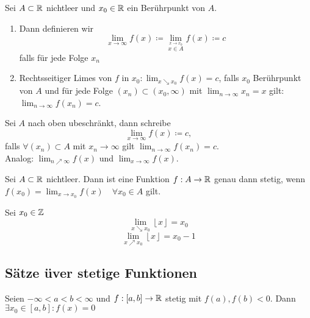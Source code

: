 \begin{subdefinition}
	Sei $ A\subset \mathbb{R} $ nichtleer und $ x_0 \in \mathbb{R}  $ ein Berührpunkt von $ A $.
	\begin{enumerate}[label=\arabic*.]
		\item Dann definieren wir
			\[
				\lim_{x \to \infty} f(x) \coloneqq \lim_{\overset{x\to x_0}{x \in A}} f(x) \coloneqq c
			\]
			falls für jede Folge $ x_n $
		\item Rechtsseitiger Limes von $ f $ in $ x_0: \lim_{x \searrow x_0} f(x) = c $, falls $ x_0 $ Berührpunkt von $ A  $ und für jede Folge $ (x_n) \subset (x_0, \infty) $ mit $ \lim_{n \to \infty} x_n = x $ gilt: $ \lim_{n \to \infty}  f(x_n) = c$.
	\end{enumerate}
	Sei $ A $ nach oben ubeschränkt, dann schreibe
	\[
		\lim_{x \to \infty} f(x) \coloneqq c,
	\]
	falls $ \forall (x_n) \subset A $ mit $ x_n \to \infty $ gilt $ \lim_{n \to \infty} f(x_n) = c $.\\
	Analog: $ \lim_{n \nearrow \infty} f(x) $ und $ \lim_{x \to \infty} f(x) $.
\end{subdefinition}

\begin{subcorollary}
	Sei $ A \subset \mathbb{R}  $ nichtleer. Dann ist eine Funktion $ f: A \to \mathbb{R}  $ genau dann stetig, wenn $ f(x_0) = \lim_{x \to x_0} f(x) \quad \forall x_0 \in A $ gilt.
\end{subcorollary}

\begin{subexample}
	Sei $ x_0 \in \mathbb{Z}  $ 
	\[
		\lim_{x \searrow x_0} \left\lfloor x \right\rfloor = x_0
	\]
	\[
		\lim_{x \nearrow x_0} \left\lfloor x \right\rfloor = x_0 -1
	\]
\end{subexample}

\subsection{Sätze üver stetige Funktionen}
\begin{subtheorem}
	Seien $ -\infty < a < b < \infty $ und $ f:[a, b] \to \mathbb{R}  $ stetig mit $ f(a), f(b) < 0 $.
	Dann $ \exists x_0 \in [a, b] : f(x) = 0 $
\end{subtheorem}

